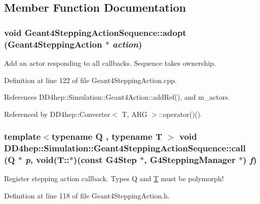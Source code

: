 \subsection{Member Function Documentation}
\hypertarget{class_d_d4hep_1_1_simulation_1_1_geant4_stepping_action_sequence_a39d7f26d436a3f512c2b467bad9d4beb}{
\subsubsection[{adopt}]{\setlength{\rightskip}{0pt plus 5cm}void Geant4SteppingActionSequence::adopt ({\bf Geant4SteppingAction} $\ast$ {\em action})}}
\label{class_d_d4hep_1_1_simulation_1_1_geant4_stepping_action_sequence_a39d7f26d436a3f512c2b467bad9d4beb}


Add an actor responding to all callbacks. Sequence takes ownership. 

Definition at line 122 of file Geant4SteppingAction.cpp.

References DD4hep::Simulation::Geant4Action::addRef(), and m\_\-actors.

Referenced by DD4hep::Converter$<$ T, ARG $>$::operator()().\hypertarget{class_d_d4hep_1_1_simulation_1_1_geant4_stepping_action_sequence_a80706eac8c225ea3773259f024d76e5e}{
\subsubsection[{call}]{\setlength{\rightskip}{0pt plus 5cm}template$<$typename Q , typename T $>$ void DD4hep::Simulation::Geant4SteppingActionSequence::call (Q $\ast$ {\em p}, \/  void(T::$\ast$)(const G4Step $\ast$, G4SteppingManager $\ast$) {\em f})}}
\label{class_d_d4hep_1_1_simulation_1_1_geant4_stepping_action_sequence_a80706eac8c225ea3773259f024d76e5e}


Register stepping action callback. Types Q and \hyperlink{class_t}{T} must be polymorph! 

Definition at line 118 of file Geant4SteppingAction.h.


